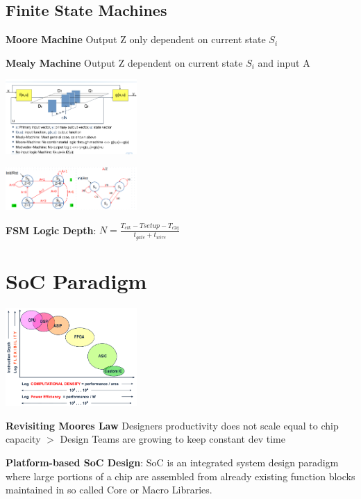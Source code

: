 \documentclass[english]{latex4ei/latex4ei_sheet}
\begin{document}
\subsection{Finite State Machines}

\textbf{Moore Machine} Output Z only dependent on current state $S_i$

\textbf{Mealy Machine} Output Z dependent on current state $S_i$ and input A

\begin{center}
	\includegraphics[width = 5cm]{images/2. SoC Logic Design Recap/FSM.png}
\end{center}
\begin{center}
	\includegraphics[width = 5cm]{images/2. SoC Logic Design Recap/MooreMealy.png}
\end{center}

\textbf{FSM Logic Depth}: $N = \frac{T_{clk} - T{setup} - T_{c2q}}{t_{gate} + t_{wire}}$



\section{SoC Paradigm}
\begin{center}
	\includegraphics[width = 5cm]{images/3.SoCParadigm/Paradigm.png}
\end{center}

\textbf{Revisiting Moores Law} Designers productivity does not scale equal to chip capacity $>$ Design Teams are growing to keep constant dev time

\textbf{Platform-based SoC Design}: SoC is an integrated system design paradigm where large portions of a chip are assembled from already existing function blocks maintained in so called Core or Macro Libraries.
\end{document}
